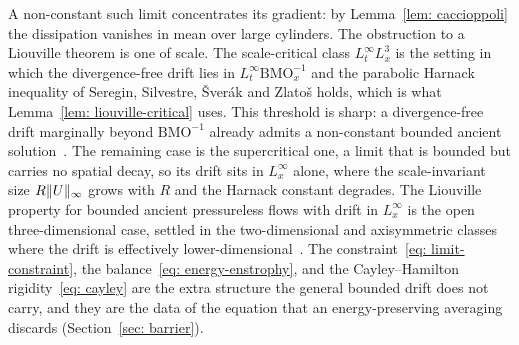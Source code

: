 A non-constant such limit concentrates its gradient: by
Lemma~\ref{lem: caccioppoli} the dissipation vanishes in mean over large cylinders.
The obstruction to a Liouville theorem is one of scale. The scale-critical class
$L^\infty_t L^3_x$ is the setting in which the divergence-free drift lies in
$L^\infty_t\mathrm{BMO}^{-1}_x$ and the parabolic Harnack inequality of Seregin,
Silvestre, \v{S}ver\'ak and Zlato\v{s} holds, which is what
Lemma~\ref{lem: liouville-critical} uses. This threshold is sharp: a divergence-free
drift marginally beyond $\mathrm{BMO}^{-1}$ already admits a non-constant bounded
ancient solution~\cite{seregin-2012-div-dri}. The remaining case is the supercritical
one, a limit that is bounded but carries no spatial decay, so its drift sits in
$L^\infty_x$ alone, where the scale-invariant size $R\lVert U \rVert_\infty$ grows with $R$
and the Harnack constant degrades. The Liouville property for bounded ancient
pressureless flows with drift in $L^\infty_x$ is the open three-dimensional case,
settled in the two-dimensional and axisymmetric classes where the drift is
effectively lower-dimensional~\cite{koch-2009-lio-the-nav}. The
constraint~\eqref{eq: limit-constraint}, the balance~\eqref{eq: energy-enstrophy},
and the Cayley--Hamilton rigidity~\eqref{eq: cayley} are the extra structure the
general bounded drift does not carry, and they are the data of the equation
that an energy-preserving averaging discards (Section~\ref{sec: barrier}).
